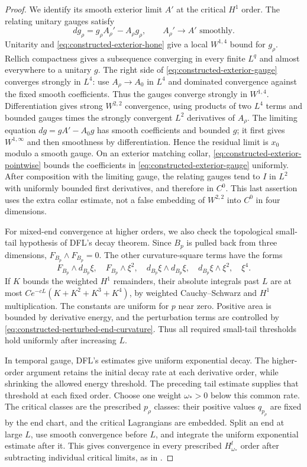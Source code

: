 \documentclass[11pt]{amsart}
\theoremstyle{definition}
\theoremstyle{remark}
\theoremstyle{plain}
\begin{document}
\begin{proof}
We identify its smooth exterior limit $A'$ at the critical $H^1$
order. The relating unitary gauges satisfy
\begin{equation}\label{eq:constructed-exterior-gauge}
                         dg_\rho=g_\rho A_\rho'-A_\rho g_\rho,
                 \qquad A_\rho'\longrightarrow A'\text{ smoothly}.
\end{equation}
Unitarity and \eqref{eq:constructed-exterior-hone} give a local
$W^{1,4}$ bound for $g_\rho$. Rellich compactness gives a subsequence
converging in every finite $L^q$ and almost everywhere to a unitary
$g$. The right side of \eqref{eq:constructed-exterior-gauge} converges
strongly in $L^4$: use $A_\rho\to A_0$ in $L^4$ and dominated
convergence against the fixed smooth coefficients. Thus the gauges
converge strongly in $W^{1,4}$. Differentiation gives strong $W^{2,2}$
convergence, using products of two $L^4$ terms and bounded gauges
times the strongly convergent $L^2$ derivatives of $A_\rho$.
The limiting equation $dg=gA'-A_0g$ has smooth coefficients and
bounded $g$; it first gives $W^{1,\infty}$ and then smoothness by
differentiation. Hence the residual limit is $x_0$ modulo a smooth
gauge. On an exterior matching collar,
\eqref{eq:constructed-exterior-pointwise} bounds the coefficients in
\eqref{eq:constructed-exterior-gauge} uniformly. After composition with
the limiting gauge, the relating gauges tend to $I$ in $L^2$ with
uniformly bounded first derivatives, and therefore in $C^0$. This last
assertion uses the extra collar estimate, not a false embedding of
$W^{2,2}$ into $C^0$ in four dimensions.

For mixed-end convergence at higher orders, we also check the
topological small-tail hypothesis of DFL's decay theorem. Since
$B_p$ is pulled back from three dimensions, $F_{B_p}\wedge F_{B_p}=0$.
The other curvature-square terms have the forms
\[
 F_{B_p}\wedge d_{B_p}\xi,\quad F_{B_p}\wedge\xi^2,\quad
 d_{B_p}\xi\wedge d_{B_p}\xi,\quad d_{B_p}\xi\wedge\xi^2,\quad\xi^4.
\]
If $K$ bounds the weighted $H^1$ remainders, their absolute integrals
past $L$ are at most $Ce^{-cL}(K+K^2+K^3+K^4)$, by weighted
Cauchy--Schwarz and $H^1$ multiplication. The constants are uniform
for $p$ near zero. Positive area is bounded by derivative energy, and
the perturbation terms are controlled by
\eqref{eq:constructed-perturbed-end-curvature}. Thus all required
small-tail thresholds hold uniformly after increasing $L$.

In temporal gauge, DFL's estimates
\cite[Propositions~5.24 and~5.29]{DaeFukLip21a} give uniform exponential
decay. The higher-order argument retains the initial decay rate at each
derivative order, while shrinking the allowed energy threshold. The
preceding tail estimate supplies that threshold at each fixed order.
Choose one weight $\omega_*>0$ below this common rate. The critical
classes are the prescribed $p_\rho$ classes: their positive values
$q_{p_\rho}$ are fixed by the end chart, and the critical Lagrangians
are embedded. Split an end at large $L$, use smooth convergence before
$L$, and integrate the uniform exponential estimate after it. This
gives convergence in every prescribed $H^l_{\omega_*}$ order after
subtracting individual critical limits, as in
\cite[equation~(5.36)]{DaeFukLip21a}.


\end{proof}
\end{document}
